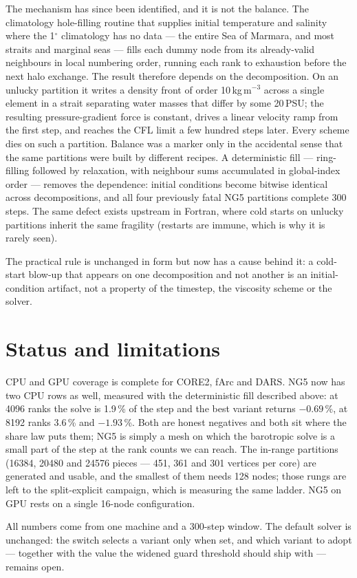 \documentclass[11pt,a4paper]{article}
\begin{document}
The mechanism has since been identified, and it is not the balance. The climatology
hole-filling routine that supplies initial temperature and salinity where the 1$^\circ$
climatology has no data --- the entire Sea of Marmara, and most straits and marginal seas ---
fills each dummy node from its already-valid neighbours in local numbering order, running each
rank to exhaustion before the next halo exchange. The result therefore depends on the
decomposition. On an unlucky partition it writes a density front of order
10\,kg\,m$^{-3}$ across a single element in a strait separating water masses that differ by
some 20\,PSU; the resulting pressure-gradient force is constant, drives a linear velocity ramp
from the first step, and reaches the CFL limit a few hundred steps later. Every scheme dies on
such a partition. Balance was a marker only in the accidental sense that the same partitions
were built by different recipes. A deterministic fill --- ring-filling followed by relaxation,
with neighbour sums accumulated in global-index order --- removes the dependence: initial
conditions become bitwise identical across decompositions, and all four previously fatal NG5
partitions complete 300 steps. The same defect exists upstream in Fortran, where cold starts on
unlucky partitions inherit the same fragility (restarts are immune, which is why it is rarely
seen).

The practical rule is unchanged in form but now has a cause behind it: a cold-start blow-up
that appears on one decomposition and not another is an initial-condition artifact, not a
property of the timestep, the viscosity scheme or the solver.

\section{Status and limitations}

CPU and GPU coverage is complete for CORE2, fArc and DARS. NG5 now has two CPU rows as well,
measured with the deterministic fill described above: at 4096 ranks the solve is 1.9\,\% of the
step and the best variant returns $-0.69$\,\%, at 8192 ranks 3.6\,\% and $-1.93$\,\%. Both are
honest negatives and both sit where the share law puts them; NG5 is simply a mesh on which the
barotropic solve is a small part of the step at the rank counts we can reach. The in-range
partitions (16384, 20480 and 24576 pieces --- 451, 361 and 301 vertices per core) are generated
and usable, and the smallest of them needs 128 nodes; those rungs are left to the
split-explicit campaign, which is measuring the same ladder. NG5 on GPU rests on a single
16-node configuration.

All numbers come from one machine and a 300-step window. The default solver is unchanged: the
switch selects a variant only when set, and which variant to adopt --- together with the value
the widened guard threshold should ship with --- remains open.
\end{document}
